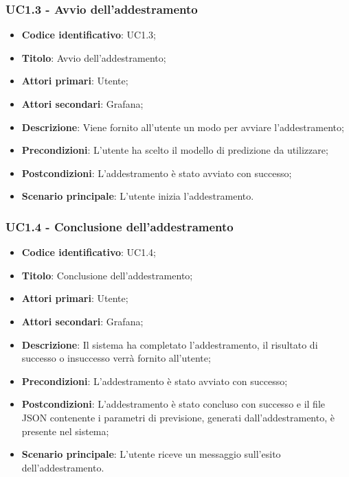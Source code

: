 \subsubsection{UC1.3 - Avvio dell'addestramento}
\begin{itemize}
	\item \textbf{Codice identificativo}: UC1.3;
	\item \textbf{Titolo}: Avvio dell'addestramento;
	\item \textbf{Attori primari}: Utente;
	\item \textbf{Attori secondari}: Grafana\glo;
	\item \textbf{Descrizione}: Viene fornito all'utente un modo per avviare l'addestramento;
	\item \textbf{Precondizioni}: L'utente ha scelto il modello di predizione da utilizzare;
	\item \textbf{Postcondizioni}: L'addestramento è stato avviato con successo;
	\item \textbf{Scenario principale}: L'utente inizia l'addestramento.
\end{itemize}

\subsubsection{UC1.4 - Conclusione dell'addestramento}
\begin{itemize}
	\item \textbf{Codice identificativo}: UC1.4;
	\item \textbf{Titolo}: Conclusione dell'addestramento;
	\item \textbf{Attori primari}: Utente;
	\item \textbf{Attori secondari}: Grafana\glo;
	\item \textbf{Descrizione}: Il sistema ha completato l'addestramento, il risultato di successo o insuccesso verrà fornito all'utente;
	\item \textbf{Precondizioni}: L'addestramento è stato avviato con successo;
	\item \textbf{Postcondizioni}: L'addestramento è stato concluso con successo e il file JSON contenente i parametri di previsione, generati dall'addestramento, è presente nel sistema;
	\item \textbf{Scenario principale}: L'utente riceve un messaggio sull'esito dell'addestramento.
\end{itemize}
